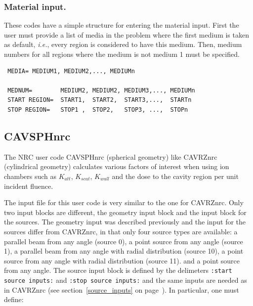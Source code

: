 \documentclass[12pt,twoside]{article}  %
\newcommand{\ie}{{\em i.e.}}
\begin{document}
\subsubsection{Material input.}

These codes have a simple structure for entering the material input. First
the user must provide a list of media in the problem where the first
medium is taken as default, \ie, every region is considered to have this
medium. Then, medium numbers for all regions where the medium is not
medium 1 must be specified.


\begin{verbatim}
 MEDIA= MEDIUM1, MEDIUM2,..., MEDIUMn

 MEDNUM=        MEDIUM2, MEDIUM2, MEDIUM3,..., MEDIUMn
 START REGION=  START1,  START2,  START3,...,  STARTn
 STOP REGION=   STOP1 ,  STOP2,   STOP3, ...,  STOPn

\end{verbatim}

\subsection{CAVSPHnrc}
The NRC user code CAVSPHnrc (spherical geometry) like CAVRZnrc
(cylindrical geometry) calculates various factors of interest when using
ion chambers such as $K_{att}$, $K_{scat}$, $K_{wall}$ and the dose to the
cavity region per unit incident fluence.

The input file for this user code is very similar to the one for
CAVRZnrc. Only two input blocks are different, the geometry input block
and the input block for the sources. The geometry input was described
previously and the input for the sources differ from CAVRZnrc, in that
only four source types are available: a parallel beam from any angle
(source 0), a point source from any angle (source 1), a parallel beam
from any angle with radial distribution (source 10), a point source from
any angle with radial distribution (source 11).
and a point source from any angle. The source input block is defined by
the delimeters {\tt :start source inputs:} and {\tt :stop source inputs:}
and the same inputs are needed as in CAVRZnrc (see
section~\ref{source_inputs} on page~\pageref{source_inputs}).  In
particular, one must define:
\end{document}
